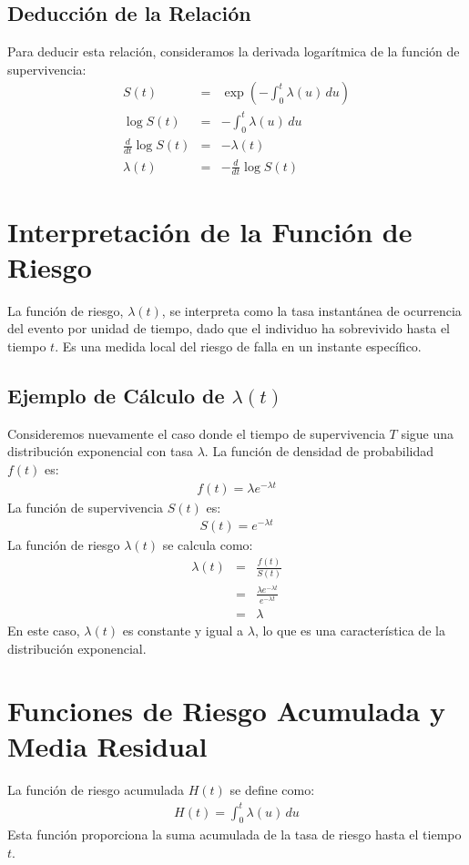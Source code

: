 \documentclass[a4paper]{report} %
\begin{document}
\subsection{Deducci\'on de la Relaci\'on}
Para deducir esta relaci\'on, consideramos la derivada logar\'itmica de la funci\'on de supervivencia:
\begin{eqnarray*}
S(t) &=& \exp\left(-\int_0^t \lambda(u) \, du\right) \\
\log S(t) &=& -\int_0^t \lambda(u) \, du \\
\frac{d}{dt} \log S(t) &=& -\lambda(t) \\
\lambda(t) &=& -\frac{d}{dt} \log S(t)
\end{eqnarray*}

\section{Interpretaci\'on de la Funci\'on de Riesgo}
La funci\'on de riesgo, $\lambda(t)$, se interpreta como la tasa instant\'anea de ocurrencia del evento por unidad de tiempo, dado que el individuo ha sobrevivido hasta el tiempo $t$. Es una medida local del riesgo de falla en un instante espec\'ifico.

\subsection{Ejemplo de C\'alculo de $\lambda(t)$}
Consideremos nuevamente el caso donde el tiempo de supervivencia $T$ sigue una distribuci\'on exponencial con tasa $\lambda$. La funci\'on de densidad de probabilidad $f(t)$ es:
\begin{eqnarray*}
f(t) = \lambda e^{-\lambda t}
\end{eqnarray*}
La funci\'on de supervivencia $S(t)$ es:
\begin{eqnarray*}
S(t) = e^{-\lambda t}
\end{eqnarray*}
La funci\'on de riesgo $\lambda(t)$ se calcula como:
\begin{eqnarray*}
\lambda(t) &=& \frac{f(t)}{S(t)} \\
           &=& \frac{\lambda e^{-\lambda t}}{e^{-\lambda t}} \\
           &=& \lambda
\end{eqnarray*}
En este caso, $\lambda(t)$ es constante y igual a $\lambda$, lo que es una caracter\'istica de la distribuci\'on exponencial.

\section{Funciones de Riesgo Acumulada y Media Residual}
La funci\'on de riesgo acumulada $H(t)$ se define como:
\begin{eqnarray*}
H(t) = \int_0^t \lambda(u) \, du
\end{eqnarray*}
Esta funci\'on proporciona la suma acumulada de la tasa de riesgo hasta el tiempo $t$.
\end{document}
